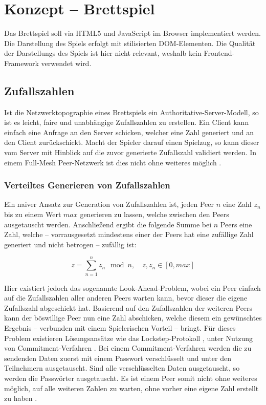 \section{Konzept -- Brettspiel}
Das Brettspiel soll via HTML5 und JavaScript im Browser implementiert werden. Die Darstellung des Spiels erfolgt mit stilisierten DOM-Elementen. Die Qualität der Darstellungs des Spiels ist hier nicht relevant, weshalb kein Frontend-Framework verwendet wird.\par

\subsection{Zufallszahlen}
Ist die Netzwerktopographie eines Brettspiels ein Authoritative-Server-Modell, so ist es leicht, faire und unabhängige Zufallszahlen zu erstellen. Ein Client kann einfach eine Anfrage an den Server schicken, welcher eine Zahl generiert und an den Client zurückschickt. Macht der Spieler darauf einen Spielzug, so kann dieser vom Server mit Hinblick auf die zuvor generierte Zufallszahl validiert werden. In einem Full-Mesh Peer-Netzwerk ist dies nicht ohne weiteres möglich \cite{rng}.\par

\subsubsection{Verteiltes Generieren von Zufallszahlen}
Ein naiver Ansatz zur Generation von Zufallszahlen ist, jeden Peer $n$ eine Zahl $z_n$ bis zu einem Wert $max$ generieren zu lassen, welche zwischen den Peers ausgetauscht werden. Anschließend ergibt die folgende Summe bei $n$ Peers eine Zahl, welche -- vorrausgesetzt mindestens einer der Peers hat eine zufällige Zahl generiert und nicht betrogen \cite{rng} -- zufällig ist:

\vspace{-20pt}
\[ z = \sum_{n=1}^{n} z_n \mod n,\quad z, z_n \in [0, max] \]
\vspace{-12pt}

Hier existiert jedoch das sogenannte \glqq{}Look-Ahead-Problem\grqq{}, wobei ein Peer einfach auf die Zufallszahlen aller anderen Peers warten kann, bevor dieser die eigene Zufallszahl abgeschickt hat. Basierend auf den Zufallszahlen der weiteren Peers kann der böswillige Peer nun eine Zahl abschicken, welche diesem ein gewünschtes Ergebnis -- verbunden mit einem Spielerischen Vorteil -- bringt. Für dieses Problem existieren Lösungsansätze wie das \glqq{}Lockstep-Protokoll\grqq{} \cite{p2pchallenges}, unter Nutzung von Commitment-Verfahren \cite{rng}. Bei einem Commitment-Verfahren werden die zu sendenden Daten zuerst mit einem Passwort verschlüsselt und unter den Teilnehmern ausgetauscht. Sind alle verschlüsselten Daten ausgetauscht, so werden die Passwörter ausgetauscht. Es ist einem Peer somit nicht ohne weiteres möglich, auf alle weiteren Zahlen zu warten, ohne vorher eine eigene Zahl erstellt zu haben \cite{rng}.\par

